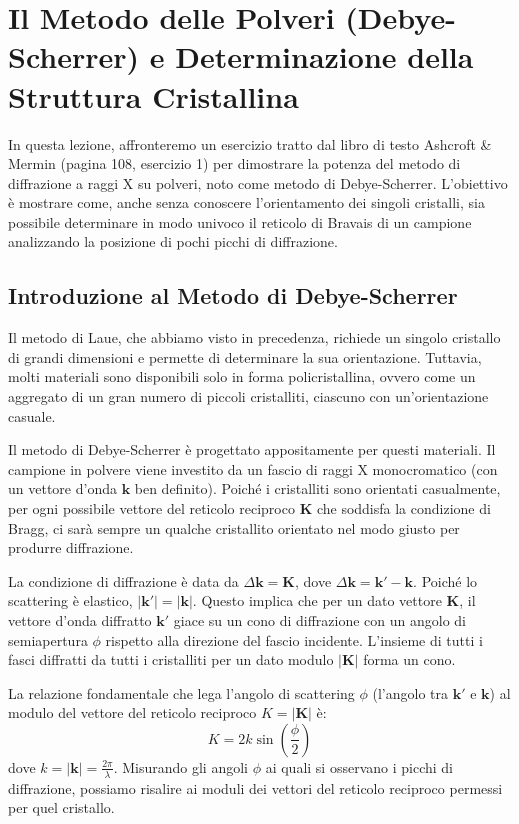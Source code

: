 \section{Il Metodo delle Polveri (Debye-Scherrer) e Determinazione della Struttura Cristallina}
\label{sec:le}
In questa lezione, affronteremo un esercizio tratto dal libro di testo Ashcroft \& Mermin (pagina 108, esercizio 1) per dimostrare la potenza del metodo di diffrazione a raggi X su polveri, noto come metodo di Debye-Scherrer. L'obiettivo è mostrare come, anche senza conoscere l'orientamento dei singoli cristalli, sia possibile determinare in modo univoco il reticolo di Bravais di un campione analizzando la posizione di pochi picchi di diffrazione.

\subsection{Introduzione al Metodo di Debye-Scherrer}

Il metodo di Laue, che abbiamo visto in precedenza, richiede un singolo cristallo di grandi dimensioni e permette di determinare la sua orientazione. Tuttavia, molti materiali sono disponibili solo in forma policristallina, ovvero come un aggregato di un gran numero di piccoli cristalliti, ciascuno con un'orientazione casuale.

Il metodo di Debye-Scherrer è progettato appositamente per questi materiali. Il campione in polvere viene investito da un fascio di raggi X monocromatico (con un vettore d'onda $\mathbf{k}$ ben definito). Poiché i cristalliti sono orientati casualmente, per ogni possibile vettore del reticolo reciproco $\mathbf{K}$ che soddisfa la condizione di Bragg, ci sarà sempre un qualche cristallito orientato nel modo giusto per produrre diffrazione.

La condizione di diffrazione è data da $\Delta\mathbf{k} = \mathbf{K}$, dove $\Delta\mathbf{k} = \mathbf{k'} - \mathbf{k}$. Poiché lo scattering è elastico, $|\mathbf{k'}| = |\mathbf{k}|$. Questo implica che per un dato vettore $\mathbf{K}$, il vettore d'onda diffratto $\mathbf{k'}$ giace su un cono di diffrazione con un angolo di semiapertura $\phi$ rispetto alla direzione del fascio incidente. L'insieme di tutti i fasci diffratti da tutti i cristalliti per un dato modulo $|\mathbf{K}|$ forma un cono.

La relazione fondamentale che lega l'angolo di scattering $\phi$ (l'angolo tra $\mathbf{k'}$ e $\mathbf{k}$) al modulo del vettore del reticolo reciproco $K = |\mathbf{K}|$ è:
$$ K = 2k \sin\left(\frac{\phi}{2}\right) $$
dove $k = |\mathbf{k}| = \frac{2\pi}{\lambda}$. Misurando gli angoli $\phi$ ai quali si osservano i picchi di diffrazione, possiamo risalire ai moduli dei vettori del reticolo reciproco permessi per quel cristallo.

